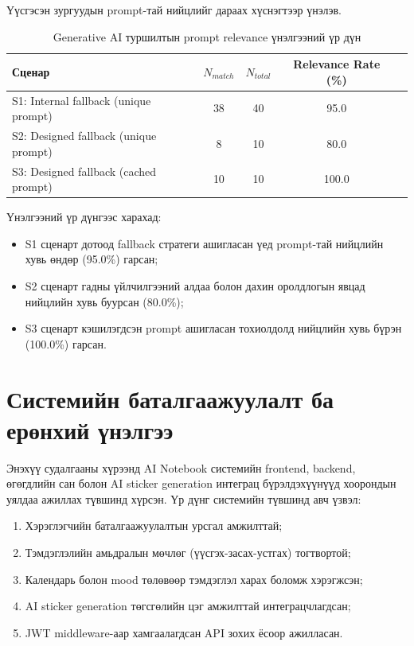 Үүсгэсэн зургуудын prompt-тай нийцлийг дараах хүснэгтээр үнэлэв.

\begin{table}[H]
\centering
\caption{Generative AI туршилтын prompt relevance үнэлгээний үр дүн}
\label{tab:genai_relevance_results}
\begin{tabular}{>{\raggedright\arraybackslash}p{3.8cm}cccc}
\toprule
\textbf{Сценар} & \textbf{$N_{match}$} & \textbf{$N_{total}$} & \textbf{Relevance Rate (\%)} \\
\midrule
S1: Internal fallback (unique prompt) & 38 & 40 & 95.0 \\
S2: Designed fallback (unique prompt) & 8 & 10 & 80.0 \\
S3: Designed fallback (cached prompt) & 10 & 10 & 100.0 \\
\bottomrule
\end{tabular}
\end{table}

Үнэлгээний үр дүнгээс харахад:
\begin{itemize}
    \item S1 сценарт дотоод fallback стратеги ашигласан үед prompt-тай нийцлийн хувь өндөр (95.0\%) гарсан;
    \item S2 сценарт гадны үйлчилгээний алдаа болон дахин оролдлогын явцад нийцлийн хувь буурсан (80.0\%);
    \item S3 сценарт кэшилэгдсэн prompt ашигласан тохиолдолд нийцлийн хувь бүрэн (100.0\%) гарсан.
\end{itemize}

\section{Системийн баталгаажуулалт ба ерөнхий үнэлгээ}
\label{sec:system_validation}

Энэхүү судалгааны хүрээнд AI Notebook системийн frontend, backend, өгөгдлийн сан болон AI sticker generation интеграц бүрэлдэхүүнүүд хоорондын уялдаа ажиллах түвшинд хүрсэн. Үр дүнг системийн түвшинд авч үзвэл:

\begin{enumerate}
    \item Хэрэглэгчийн баталгаажуулалтын урсгал амжилттай;
    \item Тэмдэглэлийн амьдралын мөчлөг (үүсгэх-засах-устгах) тогтвортой;
    \item Календарь болон mood төлөвөөр тэмдэглэл харах боломж хэрэгжсэн;
    \item AI sticker generation төгсгөлийн цэг амжилттай интеграцчлагдсан;
    \item JWT middleware-аар хамгаалагдсан API зохих ёсоор ажилласан.
\end{enumerate}

